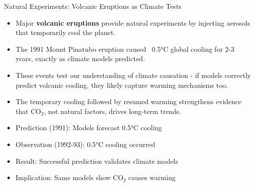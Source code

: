 \documentclass{beamer}
\begin{document}
	\begin{frame}{Natural Experiments: Volcanic Eruptions as Climate Tests}
		\begin{itemize}
			\item Major \textbf{volcanic eruptions} provide natural experiments by injecting aerosols that temporarily cool the planet.
			\item The 1991 Mount Pinatubo eruption caused ~0.5°C global cooling for 2-3 years, exactly as climate models predicted.
			\item These events test our understanding of climate causation - if models correctly predict volcanic cooling, they likely capture warming mechanisms too.
			\item The temporary cooling followed by resumed warming strengthens evidence that CO$_{2}$, not natural factors, drives long-term trends.
		\end{itemize}
		
		\begin{example}
			\begin{itemize}
				\item Prediction (1991): Models forecast 0.5°C cooling
				\item Observation (1992-93): 0.5°C cooling occurred
				\item Result: Successful prediction validates climate models
				\item Implication: Same models show CO$_{2}$ causes warming
			\end{itemize}
		\end{example}
	\end{frame}
	
\end{document}
